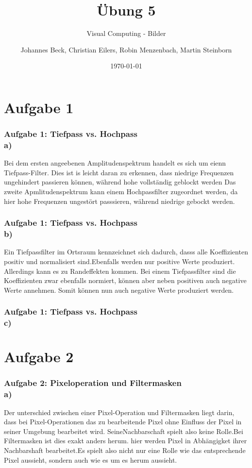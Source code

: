 \documentclass[accentcolor=tud1a,colorbacktitle,inverttitle,landscape,german,presentation,t]{tudbeamer}
\begin{document}
\title{\"Ubung 5}
\subtitle{Visual Computing - Bilder}

\author[Johannes Beck, Christian Eilers, Robin Menzenbach, Martin Steinborn]{Johannes Beck, Christian Eilers, Robin Menzenbach, Martin Steinborn}


\date{\today}

\begin{titleframe}
\end{titleframe}

\section{Aufgabe 1}
	\begin{frame}
		\frametitle{Aufgabe 1: Tiefpass vs. Hochpass \\ a)}
		Bei dem ersten angeebenen Amplitudenspektrum handelt es sich um eienn Tiefpass-Filter. Dies ist is leicht daran zu erkennen, dass niedrige Frequenzen ungehindert passieren können, während hohe vollständig geblockt werden
		Das zweite Apmlitudenspektrum kann einem Hochpassfilter zugeordnet werden, da hier hohe Frequenzen ungestört passsieren, während niedrige gebockt werden.
	\end{frame}
	
	\begin{frame}
	\frametitle{Aufgabe 1: Tiefpass vs. Hochpass \\ b)}
	Ein Tiefpassfilter im Ortsraum kennzeichnet sich dadurch, dasss alle Koeffizienten positiv und normalisiert sind.Ebenfalls werden nur positive Werte produziert. Allerdings kann es zu Randeffekten kommen. %
	Bei einem Tiefpassfilter sind die Koeffizienten zwar ebenfalls normiert, können aber neben positiven auch negative Werte annehmen. Somit können nun auch negative Werte produziert werden. %
	
	\end{frame}

	\begin{frame}
	\frametitle{Aufgabe 1: Tiefpass vs. Hochpass \\ c)}
	
	\end{frame}
\section{Aufgabe 2}
	\begin{frame}
		\frametitle{Aufgabe 2: Pixeloperation und Filtermasken \\ a)}
			\label{2_a}
			Der unterschied zwischen einer Pixel-Operation und Filtermasken liegt darin, dass bei Pixel-Operationen das zu bearbeitende Pixel ohne Einfluss der Pixel in seiner Umgebung bearbeitet wird. SeineNachbarschaft spielt also keine Rolle.Bei Filtermasken ist dies exakt anders herum. hier werden Pixel in Abhängigket ihrer Nachbarshaft bearbeitet.Es spielt also nicht nur eine Rolle wie das entsprechende Pixel aussieht, sondern auch wie es um es herum aussieht.
	\end{frame}
\end{document}
